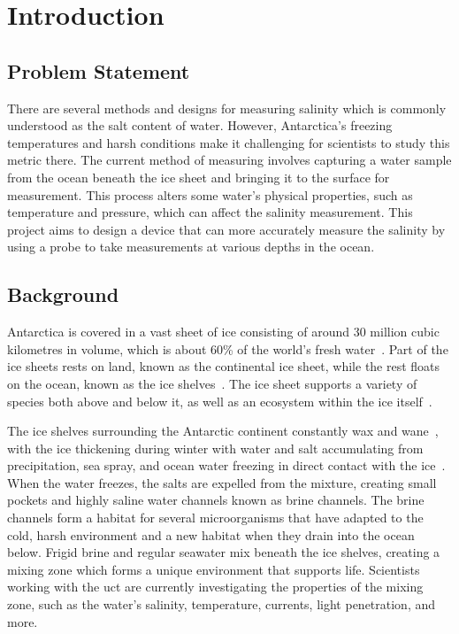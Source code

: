 
\chapter{Introduction}

\section{Problem Statement}
There are several methods and designs for measuring salinity which is commonly understood as the salt content of water.
However, Antarctica's freezing temperatures and harsh conditions make it challenging for scientists to study this metric there.
The current method of measuring involves capturing a water sample from the ocean beneath the ice sheet and bringing it to the surface for measurement.
This process alters some water's physical properties, such as temperature and pressure, which can affect the salinity measurement.
This project aims to design a device that can more accurately measure the salinity by using a probe to take measurements at various depths in the ocean.

\section{Background}
Antarctica is covered in a vast sheet of ice consisting of around 30 million cubic kilometres in volume, which is about 60\% of the world's fresh water~\cite{NSIDC_ice_sheet_facts_2024}.
Part of the ice sheets rests on land, known as the continental ice sheet, while the rest floats on the ocean, known as the ice shelves~\cite{nsidc_ice_shelves_2024}.
The ice sheet supports a variety of species both above and below it, as well as an ecosystem within the ice itself~\cite{noaa_arctic_expedition_2002}.

The ice shelves surrounding the Antarctic continent constantly wax and wane~\cite{nasa_antarctic_sea_ice_2021}, with the ice thickening during winter with water and salt accumulating from precipitation, sea spray, and ocean water freezing in direct contact with the ice~\cite{hogg_extending_record_ice_shelf_thickness_2021}.
When the water freezes, the salts are expelled from the mixture,  creating small pockets and highly saline water channels known as brine channels.
The brine channels form a habitat for several microorganisms that have adapted to the cold, harsh environment and a new habitat when they drain into the ocean below.
Frigid brine and regular seawater mix beneath the ice shelves, creating a mixing zone which forms a unique environment that supports life.
Scientists working with the \gls{uct} are currently investigating the properties of the mixing zone, such as the water's salinity, temperature, currents, light penetration, and more.


